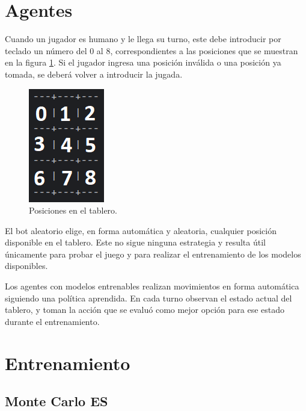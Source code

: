 \section{Agentes}

Cuando  un jugador es humano y le llega su turno, este debe introducir por teclado un número del 0 al 8, correspondientes a las posiciones que se muestran en la figura \ref{fig:human_board}. Si el jugador ingresa una posición inválida o una posición ya tomada, se deberá volver a introducir la jugada.

\begin{figure}[htbp]
	\centering
	\includegraphics[width=.25\textwidth]{./Figures/human_board.png}
	\caption{Posiciones en el tablero.}
	\label{fig:human_board}
\end{figure}

El bot aleatorio elige, en forma automática y aleatoria, cualquier posición disponible en el tablero. Este no sigue ninguna estrategia y resulta útil únicamente para probar el juego y para realizar el entrenamiento de los modelos disponibles.

Los agentes con modelos entrenables realizan movimientos en forma automática siguiendo una política aprendida. En cada turno observan el estado actual del tablero, y toman la acción que se evaluó como mejor opción para ese estado durante el entrenamiento.

\section{Entrenamiento}

\subsection{Monte Carlo ES}

